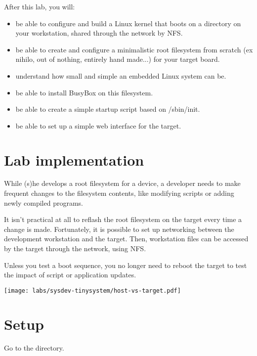 
After this lab, you will:
\begin{itemize}
\item be able to configure and build a Linux kernel that boots on a
  directory on your workstation, shared through the network by NFS.
\item be able to create and configure a minimalistic root filesystem
  from scratch (ex nihilo, out of nothing, entirely hand made...) for
  your target board.
\item understand how small and simple an embedded Linux system can be.
\item be able to install BusyBox on this filesystem.
\item be able to create a simple startup script based on /sbin/init.
\item be able to set up a simple web interface for the target.
\end{itemize}

\section{Lab implementation}

While (s)he develops a root filesystem for a device, a developer needs
to make frequent changes to the filesystem contents, like modifying
scripts or adding newly compiled programs.

It isn't practical at all to reflash the root filesystem on the target
every time a change is made. Fortunately, it is possible to set up
networking between the development workstation and the target. Then,
workstation files can be accessed by the target through the network,
using NFS.

Unless you test a boot sequence, you no longer need to reboot the
target to test the impact of script or application updates.

\begin{center}
\texttt{[image: labs/sysdev-tinysystem/host-vs-target.pdf]}
\end{center}

\section{Setup}

Go to the  directory.

